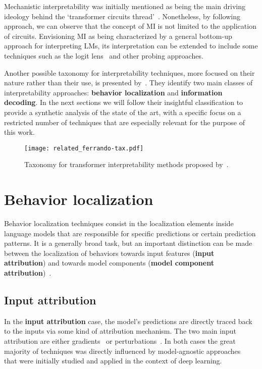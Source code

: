 Mechanistic interpretability was initially mentioned as being the main driving ideology behind the `transformer circuits thread'~\cite{elhage2021}.
Nonetheless, by following~\citet{rai2024} approach, we can observe that the concept of MI is not limited to the application of circuits.
Envisioning MI as being characterized by a general bottom-up approach for interpreting LMs, its interpretation can be extended to include some  techniques such as the logit lens~\cite{nostalgebraist2020} and other probing approaches.

Another possible taxonomy for interpretability techniques, more focused on their nature rather than their use, is presented by~\citet{ferrando2024}.
They identify two main classes of interpretability approaches: \textbf{behavior localization} and \textbf{information decoding}.
In the next sections we will follow their insightful classification to provide a synthetic analysis of the state of the art, with a specific focus on a restricted number of techniques that are especially relevant for the purpose of this work.

\begin{figure}[t!]
    \centering
    \texttt{[image: related\_ferrando-tax.pdf]}
    \caption{Taxonomy for transformer interpretability methods proposed by~\citet{ferrando2024}.}
    \label{fig:related_ferrando-tax}
\end{figure}

\section{Behavior localization}

Behavior localization techniques consist in the localization elements inside language models that are responsible for specific predictions or certain prediction patterns.
It is a generally broad task, but an important distinction can be made between the localization of behaviors towards input features (\textbf{input attribution}) and towards model components (\textbf{model component attribution})~\cite{ferrando2024}. 

\subsection{Input attribution}

In the \textbf{input attribution} case, the model's predictions are directly traced back to the inputs via some kind of attribution mechanism.
The two main input attribution  are either gradients~\cite{denil2014, ding2021, sanyal2021, enguehard2023} or perturbations~\cite{li2016, amara2024, mohebbi2023}.
In both cases the great majority of techniques was directly influenced by model-agnostic approaches~\cite{sundararajan2017, smilkov2017, ribeiro2016, lundberg2017} that were initially studied and applied in the context of deep learning.

